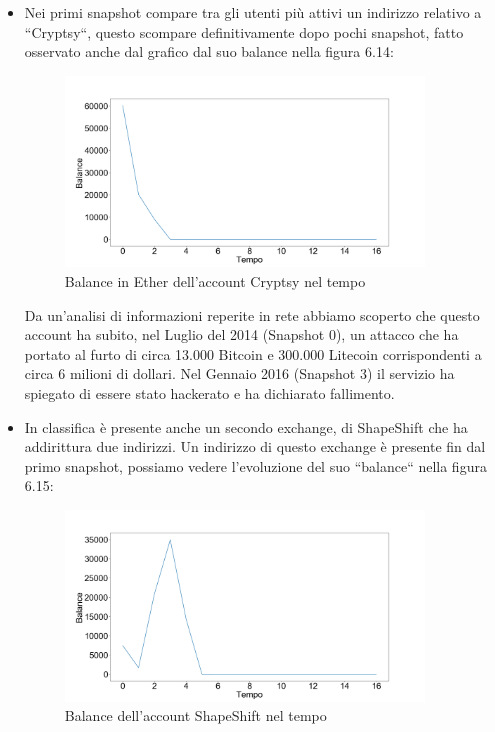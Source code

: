 \documentclass[12pt]{report}
\begin{document}
\begin{itemize}
    \item Nei primi snapshot compare tra gli utenti più attivi un indirizzo relativo a ``Cryptsy``, questo scompare definitivamente dopo pochi snapshot, fatto osservato anche dal grafico dal suo balance nella figura 6.14:
    \begin{figure}[H]
    \centering\includegraphics[width=0.9\textwidth]{Cryptsy.png}
    \caption{Balance in Ether dell'account Cryptsy nel tempo}
    \end{figure}
    Da un'analisi di informazioni reperite in rete abbiamo scoperto che questo account ha subito, nel Luglio del 2014 (Snapshot 0), un attacco che ha portato al furto di circa 13.000 Bitcoin e 300.000 Litecoin corrispondenti a circa 6 milioni di dollari. Nel Gennaio 2016 (Snapshot 3) il servizio ha spiegato di essere stato hackerato e ha dichiarato fallimento.
    \item In classifica è presente anche un secondo exchange, di ShapeShift che ha addirittura due indirizzi.
    Un indirizzo di questo exchange è presente fin dal primo snapshot, possiamo vedere l'evoluzione del suo ``balance`` nella figura 6.15:
    
    \begin{figure}[H]
    \centering\includegraphics[width=0.9\textwidth]{Shapeshift1.png}
    \caption{Balance dell'account ShapeShift nel tempo}
    \end{figure}
    

\end{itemize}
\end{document}
